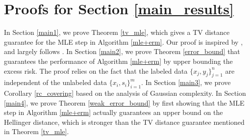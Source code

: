 \section{Proofs for Section \ref{main_results}}

In Section \ref{main1}, we prove Theorem \ref{tv_mle}, which gives a TV distance guarantee for the MLE step in Algorithm \ref{mle+erm}. Our proof is inspired by \citet{van2000empirical,Zhang_2006}, and largely follows \citet{agarwal2020flambe,pmlr-v178-liu22f}. In Section \ref{main2}, we prove Theorem \ref{error_bound} that guarantees the performance of Algorithm \ref{mle+erm} by upper bounding the excess risk. The proof relies on the fact that the labeled data $\{x_j,y_j\}^n_{j=1}$ are independent of the unlabeled data $\{x_i,s_i\}^m_{i=1}$. In Section \ref{main3}, we prove Corollary \ref{rc_covering} based on the analysis of Gaussian complexity. In Section \ref{main4}, we prove Theorem \ref{weak_error_bound} by first showing that the MLE step in Algorithm \ref{mle+erm} actually guarantees an upper bound on the Hellinger distance, which is stronger than the TV distance guarantee mentioned in Theorem \ref{tv_mle}.







